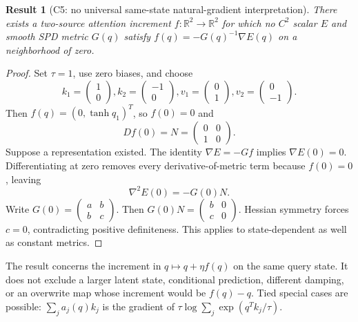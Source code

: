\documentclass[11pt]{article}
\newtheorem{result}{Result}
\newcommand{\R}{\mathbb{R}}
\begin{document}
\begin{result}[C5: no universal same-state natural-gradient interpretation]
\label{res:C5}
There exists a two-source attention increment $f:\R^2\to\R^2$ for which no $C^2$ scalar $E$ and smooth SPD metric $G(q)$ satisfy $f(q)=-G(q)^{-1}\nabla E(q)$ on a neighborhood of zero.
\end{result}
\begin{proof}
Set $\tau=1$, use zero biases, and choose
\begin{equation}
k_1=\begin{pmatrix}1\\0\end{pmatrix}, k_2=\begin{pmatrix}-1\\0\end{pmatrix},
v_1=\begin{pmatrix}0\\1\end{pmatrix}, v_2=\begin{pmatrix}0\\-1\end{pmatrix}.
\end{equation}
Then $f(q)=(0,\tanh q_1)^T$, so $f(0)=0$ and
\begin{equation}
Df(0)=N=\begin{pmatrix}0&0\\1&0\end{pmatrix}.
\end{equation}
Suppose a representation existed. The identity $\nabla E=-Gf$ implies $\nabla E(0)=0$. Differentiating at zero removes every derivative-of-metric term because $f(0)=0$, leaving
\begin{equation}
\nabla^2E(0)=-G(0)N.
\end{equation}
Write $G(0)=\left(\begin{smallmatrix}a&b\\b&c\end{smallmatrix}\right)$. Then $G(0)N=\left(\begin{smallmatrix}b&0\\c&0\end{smallmatrix}\right)$. Hessian symmetry forces $c=0$, contradicting positive definiteness. This applies to state-dependent as well as constant metrics.
\end{proof}

The result concerns the increment in $q\mapsto q+\eta f(q)$ on the same query state. It does not exclude a larger latent state, conditional prediction, different damping, or an overwrite map whose increment would be $f(q)-q$. Tied special cases are possible: $\sum_ja_j(q)k_j$ is the gradient of $\tau\log\sum_j\exp(q^Tk_j/\tau)$.
\end{document}
